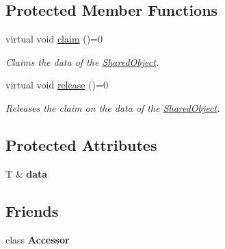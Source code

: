 \subsection*{Protected Member Functions}
\begin{DoxyCompactItemize}
\item 
\hypertarget{class_shared_object_a99c0307d7bfadbc055b22511abc68eeb}{}virtual void \hyperlink{class_shared_object_a99c0307d7bfadbc055b22511abc68eeb}{claim} ()=0\label{class_shared_object_a99c0307d7bfadbc055b22511abc68eeb}

\begin{DoxyCompactList}\small\item\em Claims the data of the \hyperlink{class_shared_object}{Shared\+Object}. \end{DoxyCompactList}\item 
\hypertarget{class_shared_object_a46035f8deebe492cff681d3b33dd98b1}{}virtual void \hyperlink{class_shared_object_a46035f8deebe492cff681d3b33dd98b1}{release} ()=0\label{class_shared_object_a46035f8deebe492cff681d3b33dd98b1}

\begin{DoxyCompactList}\small\item\em Releases the claim on the data of the \hyperlink{class_shared_object}{Shared\+Object}. \end{DoxyCompactList}\end{DoxyCompactItemize}
\subsection*{Protected Attributes}
\begin{DoxyCompactItemize}
\item 
\hypertarget{class_shared_object_a96eabb0f3550dbfa112caf68e310ffb1}{}T \& {\bfseries data}\label{class_shared_object_a96eabb0f3550dbfa112caf68e310ffb1}

\end{DoxyCompactItemize}
\subsection*{Friends}
\begin{DoxyCompactItemize}
\item 
\hypertarget{class_shared_object_ab4a12da86029f678a2567e5020e18024}{}class {\bfseries Accessor}\label{class_shared_object_ab4a12da86029f678a2567e5020e18024}

\end{DoxyCompactItemize}


